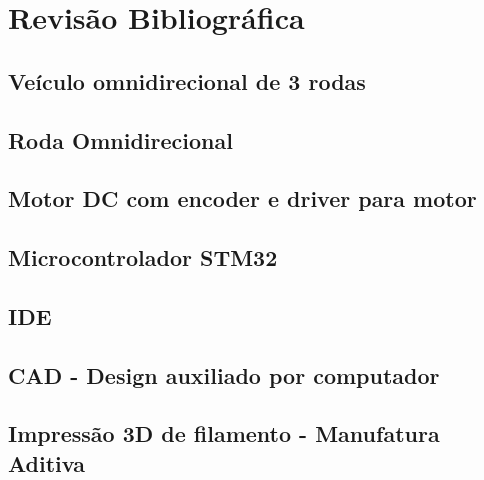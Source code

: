 
\chapter{Revisão Bibliográfica}


\section{Veículo omnidirecional de 3 rodas}


\section{Roda Omnidirecional}


\section{Motor DC com encoder e driver para motor}


\section{Microcontrolador STM32}


\section{IDE}


\section{CAD - Design auxiliado por computador}


\section{Impressão 3D de filamento - Manufatura Aditiva}
